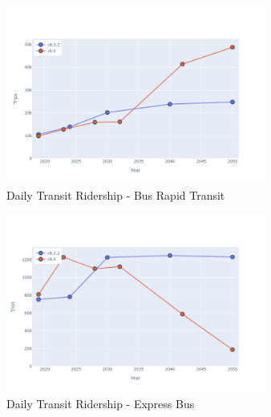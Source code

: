 \documentclass[
  letterpaper,
  DIV=11,
  numbers=noendperiod]{scrreprt}
\begin{document}
\begin{figure}[H]

{\centering \includegraphics[width=0.76\textwidth,height=\textheight]{v9x/v900/whats-new/_pictures/pdf-hy-tr-brt.png}

}

\caption{\label{fig-pdf-hy-tr-brt}Daily Transit Ridership - Bus Rapid
Transit}

\end{figure}

\begin{figure}[H]

{\centering \includegraphics[width=0.76\textwidth,height=\textheight]{v9x/v900/whats-new/_pictures/pdf-hy-tr-exp.png}

}

\caption{\label{fig-pdf-hy-tr-exp}Daily Transit Ridership - Express Bus}

\end{figure}
\end{document}

